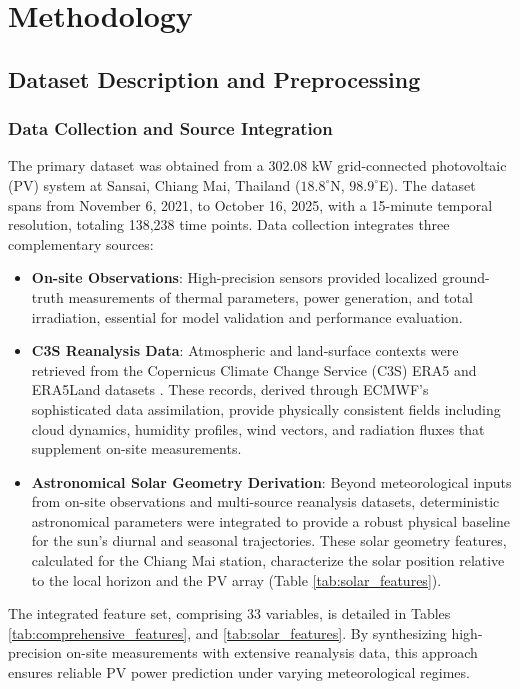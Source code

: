 \documentclass[conference]{IEEEtran}
\begin{document}
	
	
	\section{Methodology}
	
	\subsection{Dataset Description and Preprocessing}
	
	\subsubsection{\textbf{Data Collection and Source Integration}}
	The primary dataset was obtained from a 302.08 kW grid-connected photovoltaic (PV) system at Sansai, Chiang Mai, Thailand ($18.8^\circ$N, $98.9^\circ$E). The dataset spans from November 6, 2021, to October 16, 2025, with a 15-minute temporal resolution, totaling 138,238 time points. Data collection integrates three complementary sources:
	
	\begin{itemize} 
		\item \textbf{On-site Observations}: High-precision sensors provided localized ground-truth measurements of thermal parameters, power generation, and total irradiation, essential for model validation and performance evaluation. 
		\item \textbf{C3S Reanalysis Data}: Atmospheric and land-surface contexts were retrieved from the Copernicus Climate Change Service (C3S) ERA5 and ERA5Land datasets \cite{Copernicus2023, Hersbach2023, CopernicusLand2019, MunozSabater2019}. These records, derived through ECMWF's sophisticated data assimilation, provide physically consistent fields including cloud dynamics, humidity profiles, wind vectors, and radiation fluxes that supplement on-site measurements. 
		\item \textbf{Astronomical Solar Geometry Derivation}: Beyond meteorological inputs from on-site observations and multi-source reanalysis datasets, deterministic astronomical parameters were integrated to provide a robust physical baseline for the sun’s diurnal and seasonal trajectories. These solar geometry features, calculated for the Chiang Mai station, characterize the solar position relative to the local horizon and the PV array (Table \ref{tab:solar_features}).
	\end{itemize}
	
	The integrated feature set, comprising 33 variables, is detailed in Tables \ref{tab:comprehensive_features}, and \ref{tab:solar_features}. By synthesizing high-precision on-site measurements with extensive reanalysis data, this approach ensures reliable PV power prediction under varying meteorological regimes.
	
\end{document}
